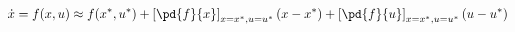 \documentclass[preview]{standalone}
\begin{document}
\begin{center}
\begin{equation}\dot{x} = {f}(x,u) \approx {f}(x^*,u^*) + \left[ \pd{f}{x}\right]_{x=x^*,u=u^*} (x - x^*) + \left[ \pd{f}{u}\right]_{x=x^*,u=u^*} (u - u^*)\end{equation}
\end{center}
\end{document}
